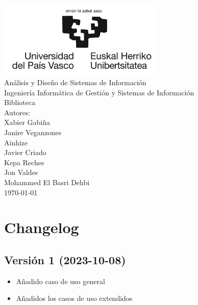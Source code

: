 \documentclass{report}
\begin{document}
    \begin{titlepage}
        \centering
        \includegraphics[width=0.6\textwidth]{./img/miscelanio/logo.jpg}\\
        \vspace{1cm}
        \LARGE Análisis y Diseño de Sistemas de Información\\
        \vspace{0.5cm}
        \Large Ingeniería Informática de Gestión y Sistemas de Información\\
        \vspace{3cm}
        \Huge Biblioteca\\
        \vspace{2.5cm}
        \Large Autores:\\
        \vspace{0.2cm}
        \large Xabier Gabiña\\
        \large Janire Veganzones\\
        \large Ainhize\\
        \large Javier Criado\\
        \large Kepa Reches\\
        \large Jon Valdes\\
        \large Mohammed El Basri Dehbi\\
        \vfill
        \today
    \end{titlepage}

    \tableofcontents
    \chapter{Changelog}
        \section{Versión 1 (2023-10-08)}
            \begin{itemize}
                \item Añadido caso de uso general
                \item Añadidos los casos de uso extendidos
            \end{itemize}   
\end{document}
